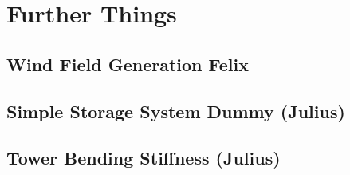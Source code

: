 \chapter{Further Things}
\section{Wind Field Generation Felix}


\section{Simple Storage System Dummy (Julius)}


\section{Tower Bending Stiffness (Julius)}



